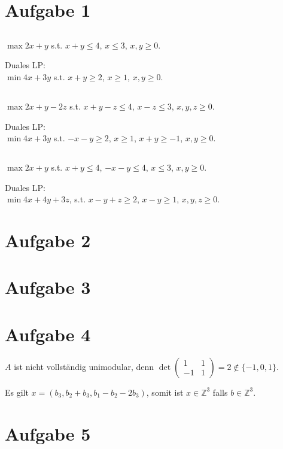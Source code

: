 \documentclass[a4paper]{article}
\begin{document}
\section{Aufgabe 1}
\subsection{}
$\max 2x+y$ s.t. $x+y \leq 4$, $x \leq 3$, $x,y \geq 0$.

Duales LP: \\
$\min 4x+3y$ s.t. $x+y \geq 2$, $x \geq 1$, $x,y \geq 0$.

\subsection{}
$\max 2x+y-2z$ s.t. $x+y-z \leq 4$, $x-z \leq 3$, $x,y,z \geq 0$.

Duales LP: \\
$\min 4x+3y$ s.t. $-x-y \geq 2$, $x \geq 1$, $x+y \geq -1$, $x,y \geq 0$.

\subsection{}
$\max 2x+y$ s.t. $x+y \leq 4$, $-x-y \leq 4$, $x \leq 3$, $x,y \geq 0$.

Duales LP: \\
$\min 4x+4y+3z$, s.t. $x-y+z \geq 2$, $x-y \geq 1$, $x,y,z \geq 0$.

\section{Aufgabe 2}

\section{Aufgabe 3}

\section{Aufgabe 4}
$A$ ist nicht vollständig unimodular, denn 
$\det \begin{pmatrix} 1&1\\-1&1 \end{pmatrix} = 2 \not\in \{ -1,0,1 \}$.

Es gilt $x = (b_3, b_2 + b_3, b_1 - b_2 - 2 b_3)$, somit ist $x \in
\mathbb{Z}^3$
falls $b \in \mathbb{Z}^3$.

\section{Aufgabe 5}
\end{document}
